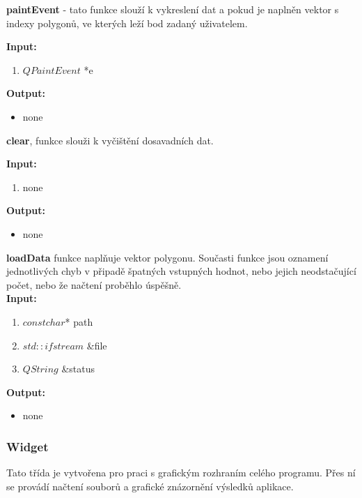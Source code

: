 \documentclass{article}
\begin{document}
\textbf{paintEvent} - tato funkce slouží k vykreslení dat a pokud je naplněn vektor s indexy polygonů, ve kterých leží bod zadaný uživatelem.

\bigskip 
 \textbf{Input:}
\begin{enumerate} 
\item $QPaintEvent $ *e
\end{enumerate}
\bigskip 
 \textbf{Output:}
\begin{itemize} 
\item none
\end{itemize}
\bigskip

\textbf{clear}, funkce slouži k vyčištění dosavadních dat.

\bigskip 
 \textbf{Input:}
\begin{enumerate} 
\item none
\end{enumerate}
\bigskip 
 \textbf{Output:}
\begin{itemize} 
\item none
\end{itemize}

\bigskip 

\textbf{loadData} funkce naplňuje vektor polygonu. Současti funkce jsou oznamení jednotlivých chyb v připadě špatných vstupných hodnot, nebo jejich neodstačující počet, nebo že načtení proběhlo úspěšně. \\ 


\bigskip 
 \textbf{Input:}
\begin{enumerate} 
\item $const char$* path
\item $std::ifstream$ \&file
\item $QString$ \&status
\end{enumerate}
\bigskip
 
 \textbf{Output:}
\begin{itemize} 
\item none
\end{itemize}

\bigskip 

\bigskip 


\subsubsection{Widget} 

\bigskip 

Tato třída je vytvořena pro praci s grafickým rozhraním celého programu. Přes ní se provádí načtení souborů a grafické znázornění výsledků aplikace. \\ 
\end{document}
